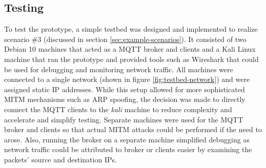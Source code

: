 \subsection{Testing}
\label{sec:prototype-testing}
To test the prototype, a simple testbed was designed and implemented to realize scenario \#3 (discussed in section \ref{sec:example-scenarios}). It consisted of two Debian 10 machines that acted as a \ac{MQTT} broker and clients and a Kali Linux machine that ran the prototype and provided tools such as Wireshark that could be used for debugging and monitoring network traffic. All machines were connected to a single network (shown in figure \ref{fig:testbed-network}) and were assigned static \ac{IP} addresses. While this setup allowed for more sophisticated \ac{MITM} mechanisms such as \ac{ARP} spoofing, the decision was made to directly connect the \ac{MQTT} clients to the \emph{kali} machine to reduce complexity and accelerate and simplify testing. Separate machines were used for the \ac{MQTT} broker and clients so that actual \ac{MITM} attacks could be performed if the need to arose. Also, running the broker on a separate machine simplified debugging as network traffic could be attributed to broker or clients easier by examining the packets' source and destination \acp{IP}.\par

